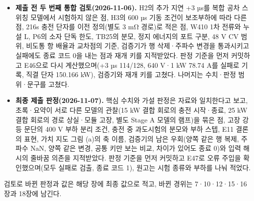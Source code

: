 \begin{itemize}
\item \textbf{제출 전 두 번째 통합 검토(2026-11-06).} H2의 추가 지연 +3 µs를 복합 공차 스위칭 모델에서 시험하지 않은 점, H3의 600 µs 기동 조건이 보조부하에 따라 다른 점, 216s 충전 단자를 이전 정의(별도 3 mΩ 경로)로 적은 점, W410 1차 전류와 누설 L, P6의 소자 단독 한도, TB25의 분모, 정지 에너지의 포트 구분, 48 V CV 범위, 비도통 항 배율과 교차점의 기준, 검증기가 행 삭제·주파수 변경을 통과시키고 실패에도 종료 코드 0을 내는 점과 재개 키를 지적받았다. 판정 기준을 먼저 커밋하고 E46으로 다시 계산했으며(+3 µs 114/128, 640 V·1 kW 78.74 A를 실패로 기록, 직결 단자 150.166 kW), 검증기와 재개 키를 고쳤다. 나머지는 수치·판정 범위·문구를 고쳤다.
\item \textbf{최종 제출 판정(2026-11-07).} 핵심 수치와 가설 판정은 자료와 일치한다고 보고, 초록·요약이 서로 다른 모델의 관찰(15 kW 결합 회로의 충전 시작·종료, 25 kW 결합 회로의 경로 상실·모듈 고장, 별도 Stage A 모델의 램프)을 묶은 점, 고장 강등 문단의 400 V 부하 분리 조건, 충전 중 과도시험의 분모와 부하 스텝, E11 결론의 표현, 가치 지도 그림 (a)의 축 이름, 검증기의 남은 우회(양쪽 같은 행 복제, 주파수 NaN, 양쪽 같은 변경, 공통 키만 보는 비교, 차이가 있어도 종료 0)와 입력 해시의 줄바꿈 의존을 지적받았다. 판정 기준을 먼저 커밋하고 E47로 오류 주입을 확인했으며(모두 실패로 검출, 종료 코드 1), 원고는 시험 종류와 부하를 나눠 적었다.
\end{itemize}

검토로 바뀐 판정과 값은 해당 장에 최종 값으로 적고, 바뀐 경위는 7·10·12·15·16장과 18장에 남긴다.
